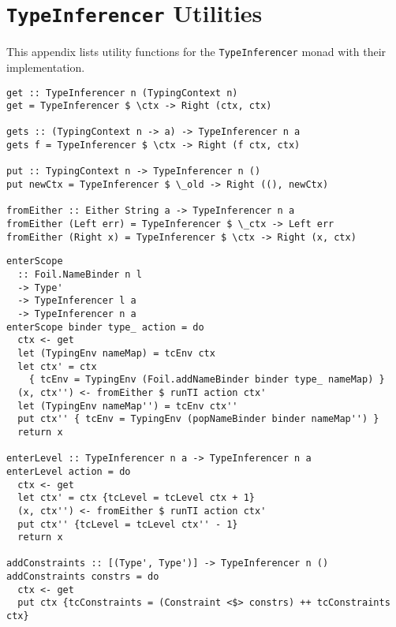 \chapter{\texttt{TypeInferencer} Utilities}
\label{chap:appendix}

This appendix lists utility functions for the \texttt{TypeInferencer} monad with their implementation.

\begin{verbatim}
get :: TypeInferencer n (TypingContext n)
get = TypeInferencer $ \ctx -> Right (ctx, ctx)

gets :: (TypingContext n -> a) -> TypeInferencer n a
gets f = TypeInferencer $ \ctx -> Right (f ctx, ctx)

put :: TypingContext n -> TypeInferencer n ()
put newCtx = TypeInferencer $ \_old -> Right ((), newCtx)

fromEither :: Either String a -> TypeInferencer n a
fromEither (Left err) = TypeInferencer $ \_ctx -> Left err
fromEither (Right x) = TypeInferencer $ \ctx -> Right (x, ctx)
\end{verbatim}
\newpage
\begin{verbatim}
enterScope
  :: Foil.NameBinder n l
  -> Type'
  -> TypeInferencer l a
  -> TypeInferencer n a
enterScope binder type_ action = do
  ctx <- get
  let (TypingEnv nameMap) = tcEnv ctx
  let ctx' = ctx
    { tcEnv = TypingEnv (Foil.addNameBinder binder type_ nameMap) }
  (x, ctx'') <- fromEither $ runTI action ctx'
  let (TypingEnv nameMap'') = tcEnv ctx''
  put ctx'' { tcEnv = TypingEnv (popNameBinder binder nameMap'') }
  return x

enterLevel :: TypeInferencer n a -> TypeInferencer n a
enterLevel action = do
  ctx <- get
  let ctx' = ctx {tcLevel = tcLevel ctx + 1}
  (x, ctx'') <- fromEither $ runTI action ctx'
  put ctx'' {tcLevel = tcLevel ctx'' - 1}
  return x

addConstraints :: [(Type', Type')] -> TypeInferencer n ()
addConstraints constrs = do
  ctx <- get
  put ctx {tcConstraints = (Constraint <$> constrs) ++ tcConstraints ctx}
\end{verbatim}
\newpage
